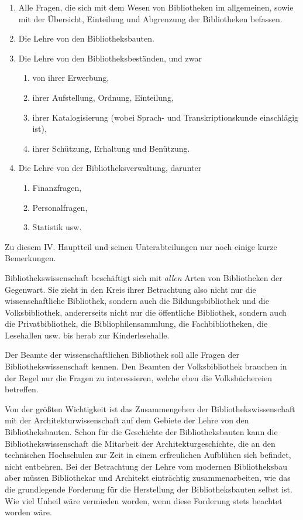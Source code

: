 \documentclass[a4paper,
fontsize=11pt,
oneside,
numbers=noperiodatend,
parskip=half-,
bibliography=totoc,
final
]{scrartcl}
\begin{document}
\begin{enumerate}
\def\labelenumi{\arabic{enumi}.}
\item
  Alle Fragen, die sich mit dem Wesen von Bibliotheken im allgemeinen,
  sowie mit der Übersicht, Einteilung und Abgrenzung der Bibliotheken
  befassen.
\item
  Die Lehre von den Bibliotheksbauten.
\item
  Die Lehre von den Bibliotheksbeständen, und zwar

  \begin{enumerate}
  \def\labelenumii{\alph{enumii})}
  \item
    von ihrer Erwerbung,
  \item
    ihrer Aufstellung, Ordnung, Einteilung,
  \item
    ihrer Katalogisierung (wobei Sprach- und Transkriptionskunde
    einschlägig ist),
  \item
    ihrer Schützung, Erhaltung und Benützung.
  \end{enumerate}
\item
  Die Lehre von der Bibliotheksverwaltung, darunter

  \begin{enumerate}
  \def\labelenumii{\alph{enumii})}
  \item
    Finanzfragen,
  \item
    Personalfragen,
  \item
    Statistik usw.
  \end{enumerate}
\end{enumerate}

Zu diesem IV. Hauptteil und seinen Unterabteilungen nur noch einige
kurze Bemerkungen.

Bibliothekswissenschaft beschäftigt sich mit \emph{allen} Arten von
Bibliotheken der Gegenwart. Sie zieht in den Kreis ihrer Betrachtung
also nicht nur die wissenschaftliche Bibliothek, sondern auch die
Bildungsbibliothek und die Volksbibliothek, andererseits nicht nur die
öffentliche Bibliothek, sondern auch die Privatbibliothek, die
Bibliophilensammlung, die Fachbibliotheken, die Lesehallen usw. bis
herab zur Kinderlesehalle.

Der Beamte der wissenschaftlichen Bibliothek soll alle Fragen der
Bibliothekswissenschaft kennen. Den Beamten der Volksbibliothek brauchen
in der Regel nur die Fragen zu interessieren, welche eben die
Volksbüchereien betreffen.

Von der größten Wichtigkeit ist das Zusammengehen der
Bibliothekswissenschaft mit der Architekturwissenschaft auf dem Gebiete
der Lehre von den Bibliotheksbauten. Schon für die Geschichte der
Bibliotheksbauten kann die Bibliothekswissenschaft die Mitarbeit der
Architekturgeschichte, die an den technischen Hochschulen zur Zeit in
einem erfreulichen Aufblühen sich befindet, nicht entbehren. Bei der
Betrachtung der Lehre vom modernen Bibliotheksbau aber müssen
Bibliothekar und Architekt einträchtig zusammenarbeiten, wie das die
grundlegende Forderung für die Herstellung der Bibliotheksbauten selbst
ist. Wie viel Unheil wäre vermieden worden, wenn diese Forderung stets
beachtet worden wäre.
\end{document}
